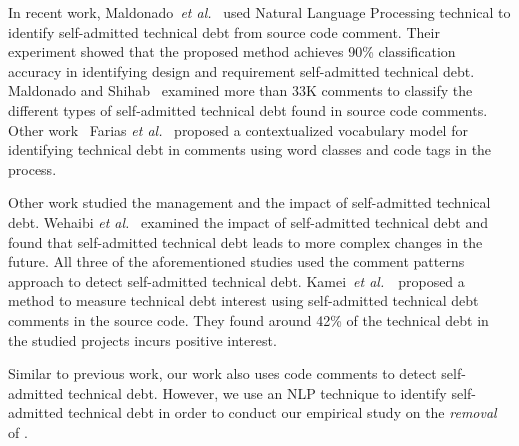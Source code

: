 In recent work, Maldonado~\textit{et al.}~\cite{Maldonado2015TSE} used Natural Language Processing technical to identify self-admitted technical debt from source code comment. Their experiment showed that the proposed method achieves 90\% classification accuracy in identifying design and requirement self-admitted technical debt.  Maldonado and Shihab~\cite{Maldonado2015MTD} examined more than 33K comments to classify the different types of self-admitted technical debt found in source code comments. Other work~ Farias \textit{et al.}~\cite{Farias2015MTD} proposed a contextualized vocabulary model for identifying technical debt in comments using word classes and code tags in the process.



Other work studied the management and the impact of self-admitted technical debt. Wehaibi \textit{et al.}~\cite{Wehaibi2016SANER} examined the impact of self-admitted technical debt and found that self-admitted technical debt leads to more complex changes in the future. All three of the aforementioned studies used the comment patterns approach to detect self-admitted technical debt. Kamei~\textit{et al.}~\cite{kameiusingTDA2016}~proposed a method to measure technical debt interest using self-admitted technical debt comments in the source code. They found around 42\% of the technical debt in the studied projects incurs positive interest.


Similar to previous work, our work also uses code comments to detect self-admitted technical debt. However, we use an NLP technique to identify self-admitted technical debt in order to conduct our empirical study on the \emph{removal} of \SATD.











